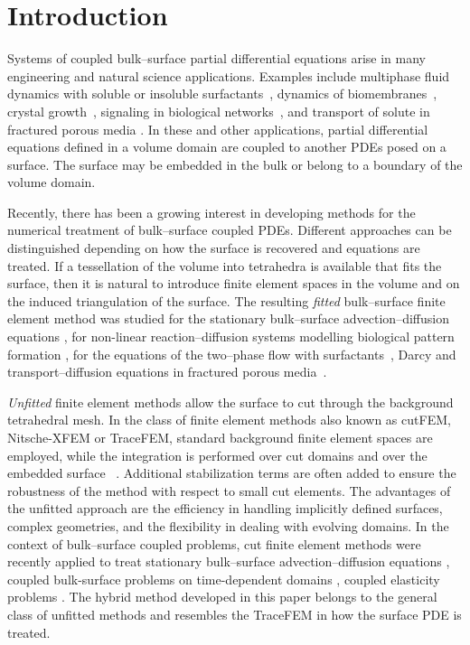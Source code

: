 \documentclass{article}
\begin{document}
\section{Introduction}
Systems of coupled bulk--surface partial differential equations arise in many engineering and natural science applications. Examples include multiphase fluid dynamics with soluble or insoluble surfactants~\cite{GrossReuskenBook}, dynamics of biomembranes~\cite{bonito2011dynamics}, crystal growth~\cite{Crystal},  signaling in biological networks~\cite{Cells}, and transport of solute in fractured porous media \cite{alboin2002modeling}. In these and other applications, partial differential equations defined in a volume domain are coupled to another PDEs posed on a surface. The surface may be embedded in the bulk or belong to a boundary of the volume domain.

Recently, there has been a growing interest in developing methods for the numerical treatment of bulk--surface coupled PDEs.
Different approaches  can be distinguished depending on how the surface is recovered and equations are treated.
If a  tessellation of the volume into tetrahedra is available that fits the surface, then it is natural to introduce finite element spaces in the volume and on the induced triangulation of the surface. The resulting \textit{fitted} bulk--surface finite element method was studied  for the stationary bulk--surface advection--diffusion equations \cite{ER2013}, for non-linear reaction--diffusion systems modelling biological pattern formation  \cite{madzvamuse2016bulk,madzvamuse2015stability}, for the equations of the two--phase flow with surfactants~\cite{barrett2015stable,barrett2015stable2},  Darcy and transport--diffusion  equations in fractured porous media~\cite{alboin2002modeling}.  %

\textit{Unfitted} finite element methods allow the surface to cut through the background tetrahedral mesh. In the class of finite element methods also known as cutFEM, Nitsche-XFEM or TraceFEM, standard background finite element spaces are employed, while the integration is performed over cut domains and over the embedded surface~ \cite{cutFEM,TraceFEM}. Additional stabilization terms are often added to ensure the robustness of the method with respect to small cut elements. The advantages of the unfitted approach are the efficiency in handling implicitly defined surfaces, complex geometries,   and  the flexibility in dealing with evolving domains. In the context of bulk--surface coupled problems,  cut finite element methods were recently applied to treat  stationary bulk--surface advection--diffusion equations \cite{gross2015trace}, %
coupled bulk-surface problems on time-dependent domains \cite{hansbo2016cut}, coupled elasticity problems \cite{cenanovic2015cut}. The hybrid  method developed in this paper belongs to the general class of unfitted methods and resembles the TraceFEM in how the surface PDE is treated.
\end{document}
